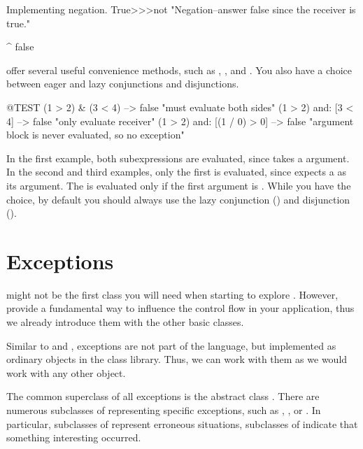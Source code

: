 \documentclass[a4paper,10pt,twoside]{book}
\begin{document}
\begin{method}{Implementing negation.}
True>>>not
    "Negation--answer false since the receiver is true."

    ^ false
\end{method}

 offer several useful convenience methods, such as , , and .
You also have a choice between eager and lazy conjunctions and disjunctions.

\begin{code}{@TEST}
(1 > 2) & (3 < 4)              --> false    "must evaluate both sides"
(1 > 2) and: [3 < 4]        --> false    "only evaluate receiver"
(1 > 2) and: [(1 / 0) > 0] --> false    "argument block is never evaluated, so no exception"
\end{code}

In the first example, both  subexpressions are evaluated, since  takes a  argument.
In the second and third examples, only the first is evaluated, since  expects a  as its argument.
The  is evaluated only if the first argument is .
While you have the choice, by default you should always use the lazy conjunction () and disjunction ().


\section{Exceptions}

 might not be the first class you will need when starting to explore \sq.
However,  provide a fundamental way to influence the control flow in your application, thus we already introduce them with the other basic classes.

Similar to  and , exceptions are not part of the language, but implemented as ordinary objects in the class library.
Thus, we can work with them as we would work with any other object.

The common superclass of all exceptions is the abstract class .
There are numerous subclasses of  representing specific exceptions, such as , , or .
In particular, subclasses of  represent erroneous situations, subclasses of  indicate that something interesting occurred.
\end{document}

